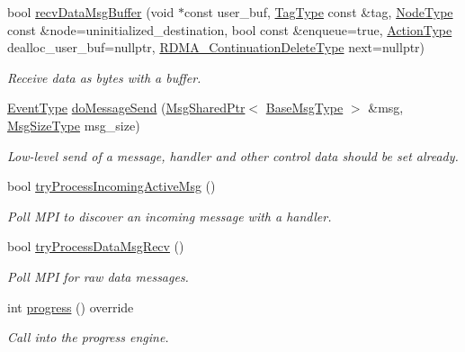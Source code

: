 \begin{DoxyCompactItemize}
bool \hyperlink{structvt_1_1messaging_1_1_active_messenger_a0e2271b6c52382bf2338f35f539225eb}{recv\+Data\+Msg\+Buffer} (void $\ast$const user\+\_\+buf, \hyperlink{namespacevt_a84ab281dae04a52a4b243d6bf62d0e52}{Tag\+Type} const \&tag, \hyperlink{namespacevt_a866da9d0efc19c0a1ce79e9e492f47e2}{Node\+Type} const \&node=uninitialized\+\_\+destination, bool const \&enqueue=true, \hyperlink{namespacevt_ae0a5a7b18cc99d7b732cb4d44f46b0f3}{Action\+Type} dealloc\+\_\+user\+\_\+buf=nullptr, \hyperlink{namespacevt_a4dfad0b5809d9812d60a0311a45ae0c2}{R\+D\+M\+A\+\_\+\+Continuation\+Delete\+Type} next=nullptr)
\begin{DoxyCompactList}\small\item\em Receive data as bytes with a buffer. \end{DoxyCompactList}\item 
\hyperlink{namespacevt_a009267401def7ae8bf201892222d060f}{Event\+Type} \hyperlink{structvt_1_1messaging_1_1_active_messenger_aa1d3d725885993caa7836f1f5294710a}{do\+Message\+Send} (\hyperlink{structvt_1_1messaging_1_1_msg_shared_ptr}{Msg\+Shared\+Ptr}$<$ \hyperlink{namespacevt_a44d0d4e144748f2b19a1cfd962f50338}{Base\+Msg\+Type} $>$ \&msg, \hyperlink{namespacevt_abfa009d900299ac1df967b40ea8f2c8a}{Msg\+Size\+Type} msg\+\_\+size)
\begin{DoxyCompactList}\small\item\em Low-\/level send of a message, handler and other control data should be set already. \end{DoxyCompactList}\item 
bool \hyperlink{structvt_1_1messaging_1_1_active_messenger_a65ec9bc6f62213cac6320ea76cdd4d47}{try\+Process\+Incoming\+Active\+Msg} ()
\begin{DoxyCompactList}\small\item\em Poll M\+PI to discover an incoming message with a handler. \end{DoxyCompactList}\item 
bool \hyperlink{structvt_1_1messaging_1_1_active_messenger_af4dafc0786bb0515293356e78035a71e}{try\+Process\+Data\+Msg\+Recv} ()
\begin{DoxyCompactList}\small\item\em Poll M\+PI for raw data messages. \end{DoxyCompactList}\item 
int \hyperlink{structvt_1_1messaging_1_1_active_messenger_a4cd83c125e144ecbd9425fa7cd194538}{progress} () override
\begin{DoxyCompactList}\small\item\em Call into the progress engine. \end{DoxyCompactList}\item 

\end{DoxyCompactItemize}
